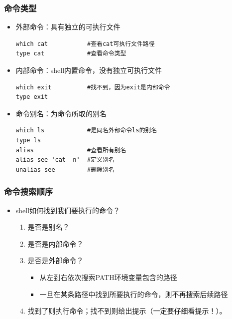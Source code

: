 \documentclass[xcolor=svgnames,presentation]{beamer}
\begin{document}
\begin{frame}[fragile]
\frametitle{命令类型}
\label{sec-4-3-2}
\begin{itemize}

\item 外部命令：具有独立的可执行文件\\
\label{sec-4-3-2-1}%
\begin{verbatim}
which cat           #查看cat可执行文件路径
type cat            #查看命令类型
\end{verbatim}

\item 内部命令：shell内置命令，没有独立可执行文件\\
\label{sec-4-3-2-2}%
\begin{verbatim}
which exit          #找不到，因为exit是内部命令
type exit
\end{verbatim}

\item 命令别名：为命令所取的别名\\
\label{sec-4-3-2-3}%
\begin{verbatim}
which ls            #是同名外部命令ls的别名
type ls
alias               #查看所有别名
alias see 'cat -n'  #定义别名
unalias see         #删除别名
\end{verbatim}
\end{itemize} %
\end{frame}
\begin{frame}
\frametitle{命令搜索顺序}
\label{sec-4-3-3}
\begin{itemize}

\item shell如何找到我们要执行的命令？
\label{sec-4-3-3-1}%
\begin{enumerate}
\item 是否是别名？
\item 是否是内部命令？
\item 是否是外部命令？
\begin{itemize}
\item 从左到右依次搜索PATH环境变量包含的路径
\item 一旦在某条路径中找到所要执行的命令，则不再搜索后续路径
\end{itemize}
\item 找到了则执行命令；找不到则给出提示（一定要仔细看提示！）。
\end{enumerate}
\end{itemize} %
\end{frame}
\end{document}
